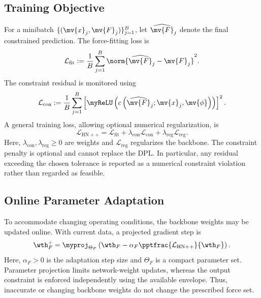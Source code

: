 \subsection{Training Objective}
\label{Tire:sec:training:objective}

For a minibatch $\{(\mv{x}_j,\mv{F}_j)\}_{j=1}^{B}$, let $\widehat{\mv{F}}_j$
denote the final constrained prediction. The force-fitting loss is
\begin{equation}
	\label{Tire:eq:fit:loss}
	\mathcal{L}_{\mathrm{fit}}
	:=
	\frac{1}{B}
	\sum_{j=1}^{B}
	\norm{
		\widehat{\mv{F}}_j
		-
		\mv{F}_j
	}^2
	.
\end{equation}
The constraint residual is monitored using
\begin{equation}
	\label{Tire:eq:constraint:loss}
	\mathcal{L}_{\mathrm{con}}
	:=
	\frac{1}{B}
	\sum_{j=1}^{B}
	\left[
		\myReLU
		\left(
		c
		\left(
		\widehat{\mv{F}}_j;\mv{x}_j,\mv{\phi}
		\right)
		\right)
		\right]^2
	.
\end{equation}
A general training loss, allowing optional numerical regularization, is
\begin{equation}
	\label{Tire:eq:total:loss}
	\mathcal{L}_{\mathrm{HN++}}
	=
	\mathcal{L}_{\mathrm{fit}}
	+
	\lambda_{\mathrm{con}}\mathcal{L}_{\mathrm{con}}
	+
	\lambda_{\mathrm{reg}}\mathcal{L}_{\mathrm{reg}}
	.
\end{equation}
Here, $\lambda_{\mathrm{con}},\lambda_{\mathrm{reg}}\geq0$ are
weights and $\mathcal{L}_{\mathrm{reg}}$ regularizes the backbone.
The constraint penalty is optional and cannot replace the DPL.
In particular, any residual exceeding the chosen tolerance is reported
as a numerical constraint violation rather than regarded as feasible.

\subsection{Online Parameter Adaptation}
\label{Tire:sec:online:adaptation}

To accommodate changing operating conditions, the backbone weights may be
updated online. With current data, a projected gradient step is
\begin{equation}
	\label{Tire:eq:adaptation}
	\wth_F^{+}
	=
	\myproj_{\Theta_F}
	\left(
	\wth_F
	-
	\alpha_F
	\pptfrac{\mathcal{L}_{\mathrm{HN++}}}{\wth_F}
	\right)
	.
\end{equation}
Here, $\alpha_F>0$ is the adaptation step size and $\Theta_F$ is a
compact parameter set. Parameter projection limits network-weight
updates, whereas the output constraint is enforced independently
using the available envelope. Thus, inaccurate or changing backbone
weights do not change the prescribed force set.

